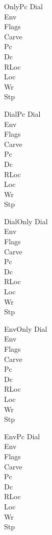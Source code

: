 \documentclass[a4paper,10pt,fleqn]{article}
\begin{document}
\begin{schema}{OnlyPc}
  \Xi Dial \\ \Xi Env \\ \Xi Flags \\ \Xi Carve \\ \Delta Pc \\ \Xi Dc \\
  \Xi RLoc \\ \Xi Loc \\ \Xi Wr \\ \Xi Stp
\end{schema}

\begin{schema}{DialPc}
  \Delta Dial \\ \Xi Env \\ \Xi Flags \\ \Xi Carve \\ \Delta Pc \\ \Xi Dc \\
  \Xi RLoc \\ \Xi Loc \\ \Xi Wr \\ \Xi Stp
\end{schema}

\begin{schema}{DialOnly}
  \Delta Dial \\ \Xi Env \\ \Xi Flags \\ \Xi Carve \\ \Xi Pc \\ \Xi Dc \\
  \Xi RLoc \\ \Xi Loc \\ \Xi Wr \\ \Xi Stp
\end{schema}

\begin{schema}{EnvOnly}
  \Xi Dial \\ \Delta Env \\ \Xi Flags \\ \Xi Carve \\ \Xi Pc \\ \Xi Dc \\
  \Xi RLoc \\ \Xi Loc \\ \Xi Wr \\ \Xi Stp
\end{schema}

\begin{schema}{EnvPc}
  \Xi Dial \\ \Delta Env \\ \Xi Flags \\ \Xi Carve \\ \Delta Pc \\ \Xi Dc \\
  \Xi RLoc \\ \Xi Loc \\ \Xi Wr \\ \Xi Stp
\end{schema}
\end{document}
